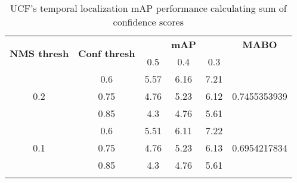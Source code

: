 \begin{center}

  \setlength{\tabcolsep}{2pt}
  \begin{longtable}{|| c | c || c c c | c ||}

    \hline
    \multirow{2}{*}{\textbf{NMS thresh}} & \multirow{2}{*}{\textbf{Conf thresh}} & {} & \textbf{mAP} & {} & \textbf{MABO} \\
    {} & {} & 0.5 & 0.4 & 0.3 & {}\\
    \hline
    \multirow{3}{*}{0.2} & 0.6 & 5.57 & 6.16 & 7.21 & \multirow{3}{*}{0.7455353939}\\
    \cline{2-5}
    {} & 0.75 & 4.76 & 5.23 & 6.12 & {}\\
    \cline{2-5}
    {} & 0.85 & 4.3 & 4.76 & 5.61 & {}\\
    \hline
    \multirow{3}{*}{0.1} & 0.6 & 5.51 & 6.11 & 7.22 & \multirow{3}{*}{0.6954217834} \\
    \cline{2-5}
    {} & 0.75 & 4.76 & 5.23 & 6.13 & {}\\
    \cline{2-5}
    {} & 0.85 & 4.3 & 4.76 & 5.61 & {}\\
    \hline

    \caption{UCF's temporal localization mAP performance calculating sum of confidence scores}
    \label{table:temp_cls_3}
  \end{longtable}
\end{center}

